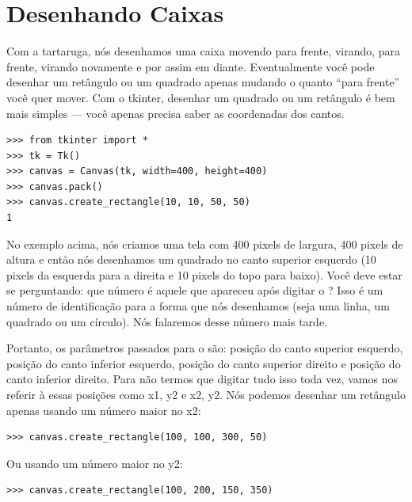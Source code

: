 \section{Desenhando Caixas}

Com a tartaruga, nós desenhamos uma caixa movendo para frente, virando, para frente, virando novamente e por assim em diante. Eventualmente você pode desenhar um retângulo ou um quadrado apenas mudando o quanto ``para frente'' você quer mover. Com o tkinter, desenhar um quadrado ou um retângulo é bem mais simples --- você apenas precisa saber as coordenadas dos cantos.

\begin{listingignore}
\begin{verbatim}
>>> from tkinter import *
>>> tk = Tk()
>>> canvas = Canvas(tk, width=400, height=400)
>>> canvas.pack()
>>> canvas.create_rectangle(10, 10, 50, 50)
1
\end{verbatim}
\end{listingignore}

No exemplo acima, nós criamos uma tela com 400 pixels de largura, 400 pixels de altura e então nós desenhamos um quadrado no canto superior esquerdo (10 pixels da esquerda para a direita e 10 pixels do topo para baixo). Você deve estar se perguntando: que número é aquele que apareceu após digitar o ? Isso é um número de identificação para a forma que nós desenhamos (seja uma linha, um quadrado ou um círculo). Nós falaremos desse número mais tarde.

Portanto, os parâmetros passados para o  são: posição do canto superior esquerdo, posição do canto inferior esquerdo, posição do canto superior direito e posição do canto inferior direito. Para não termos que digitar tudo isso toda vez, vamos nos referir à essas posições como x1, y2 e x2, y2. Nós podemos desenhar um retângulo apenas usando um número maior no x2:

\begin{listing}
\begin{verbatim}
>>> canvas.create_rectangle(100, 100, 300, 50)
\end{verbatim}
\end{listing}

\noindent
Ou usando um número maior no y2:

\begin{listing}
\begin{verbatim}
>>> canvas.create_rectangle(100, 200, 150, 350)
\end{verbatim}
\end{listing}

